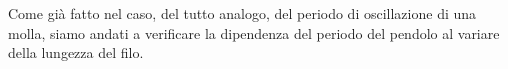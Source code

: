 Come già fatto nel caso, del tutto analogo, del
periodo di oscillazione di una molla, siamo andati a verificare la dipendenza
del periodo del pendolo al variare della lungezza del filo.
